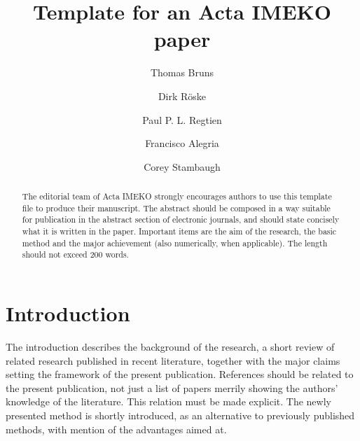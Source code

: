 \documentclass[10pt]{../imeko_acta}
\begin{document}

\title{Template for an Acta IMEKO paper} %

\author[1]{Thomas Bruns}
\author[2]{Dirk Röske}
\author[2]{Paul P. L. Regtien}
\author[3]{Francisco Alegria}
\author[1]{Corey Stambaugh}






\begin{abstract}
The editorial team of Acta IMEKO strongly encourages 
authors to use this \LaTeXe template file to produce their manuscript. 
The abstract should be composed in a way suitable for publication 
in the abstract section of electronic journals, 
and should state concisely what it is written in the paper. 
Important items are the aim of the research, the basic method and the major achievement 
(also numerically, when applicable). The length should not exceed 200 words.
\end{abstract}

\maketitle %
\section{Introduction}

The introduction describes the background of the research, a 
short review of related research published in recent literature, 
together with the major claims setting the framework of the 
present publication. References should be related to the present 
publication, not just a list of papers merrily showing the authors'
knowledge of the literature. This relation must be made explicit. 
The newly presented method is shortly introduced, as an 
alternative to previously published methods, with mention of the 
advantages aimed at.
\end{document}
